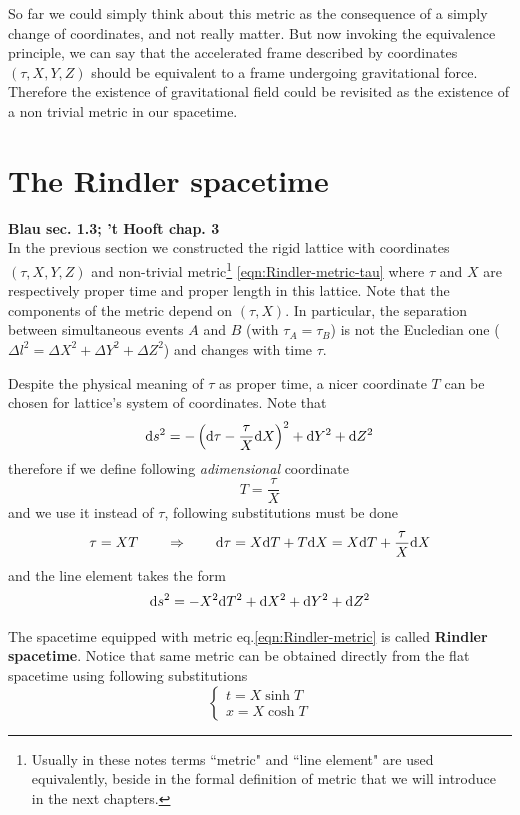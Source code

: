 \documentclass[../main/main.tex]{subfiles}
\begin{document}
So far we could simply think about this metric as the consequence of a simply change of coordinates, and not really matter. But now invoking the equivalence principle, we can say that the accelerated frame described by coordinates  $(\tau,X,Y,Z)$ should be equivalent to a frame undergoing gravitational force.
Therefore the existence of gravitational field could be revisited as the existence of a non trivial metric in our spacetime. 


\section{The Rindler spacetime}
\textbf{Blau sec. 1.3; 't Hooft chap. 3}\\

 In the previous section we constructed the rigid lattice with coordinates $(\tau,X,Y,Z)$ and non-trivial metric\footnote{Usually in these notes terms ``metric" and ``line element" are used equivalently, beside in the formal definition of metric that we will introduce in the next chapters.} \eqref{eqn:Rindler-metric-tau} where $\tau$ and $X$ are respectively proper time and proper length in this lattice. 
Note that the components of the metric depend on $(\tau,X)$. In particular, the separation between simultaneous events $A$ and $B$ (with $\tau_A=\tau_B$) is not the Eucledian one ($\Delta l^2=\Delta X^2+\Delta Y^2+\Delta Z^2$) and changes with time $\tau$.

Despite the physical meaning of $\tau$ as proper time, a nicer coordinate $T$ can be chosen for lattice's system of coordinates. Note that
\[\textup{d} s^2=-\left(\textup{d}\tau-\frac\tau X\textup{d} X\right)^2+\textup{d} Y^2+\textup{d} Z^2\]
therefore if we define following \emph{adimensional} coordinate
\[T=\frac\tau X\]
and we use it instead of $\tau$, following substitutions must be done
\[\tau=XT\qquad\Rightarrow\qquad\textup{d}\tau=X\textup{d} T+T\textup{d} X=X\textup{d} T+\frac\tau X\textup{d} X\]
 and the line element takes the form
\begin{equation}\label{eqn:Rindler-metric}
\textup{d} s^2=-X^2\textup{d} T^2+\textup{d} X^2+\textup{d} Y^2+\textup{d} Z^2
\end{equation}

The spacetime equipped with metric eq.\eqref{eqn:Rindler-metric} is called \textbf{Rindler spacetime}. 
Notice that same metric can be obtained directly from the flat spacetime using following substitutions
\[\begin{cases}
t=X\sinh T\\
x=X\cosh T
\end{cases}\]
\end{document}
